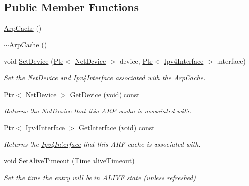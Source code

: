 \subsection*{Public Member Functions}
\begin{DoxyCompactItemize}
\item 
\hyperlink{classns3_1_1ArpCache_ab8f759ac5cf08b48f1c7f1024c4b482f}{Arp\+Cache} ()
\item 
\hyperlink{classns3_1_1ArpCache_a2b97679e365f8b80cdf620f23d2a5695}{$\sim$\+Arp\+Cache} ()
\item 
void \hyperlink{classns3_1_1ArpCache_a8cd550f89be088d8941f65f5ab3f8241}{Set\+Device} (\hyperlink{classns3_1_1Ptr}{Ptr}$<$ \hyperlink{classns3_1_1NetDevice}{Net\+Device} $>$ device, \hyperlink{classns3_1_1Ptr}{Ptr}$<$ \hyperlink{classns3_1_1Ipv4Interface}{Ipv4\+Interface} $>$ interface)
\begin{DoxyCompactList}\small\item\em Set the \hyperlink{classns3_1_1NetDevice}{Net\+Device} and \hyperlink{classns3_1_1Ipv4Interface}{Ipv4\+Interface} associated with the \hyperlink{classns3_1_1ArpCache}{Arp\+Cache}. \end{DoxyCompactList}\item 
\hyperlink{classns3_1_1Ptr}{Ptr}$<$ \hyperlink{classns3_1_1NetDevice}{Net\+Device} $>$ \hyperlink{classns3_1_1ArpCache_ad5772bef995ba37ef8b2607fe9a878e1}{Get\+Device} (void) const 
\begin{DoxyCompactList}\small\item\em Returns the \hyperlink{classns3_1_1NetDevice}{Net\+Device} that this A\+RP cache is associated with. \end{DoxyCompactList}\item 
\hyperlink{classns3_1_1Ptr}{Ptr}$<$ \hyperlink{classns3_1_1Ipv4Interface}{Ipv4\+Interface} $>$ \hyperlink{classns3_1_1ArpCache_a0876842c4ecdfcc3d8a591545163a3b8}{Get\+Interface} (void) const 
\begin{DoxyCompactList}\small\item\em Returns the \hyperlink{classns3_1_1Ipv4Interface}{Ipv4\+Interface} that this A\+RP cache is associated with. \end{DoxyCompactList}\item 
void \hyperlink{classns3_1_1ArpCache_a69b80e4ba6fa363178e72eb090a903d4}{Set\+Alive\+Timeout} (\hyperlink{classns3_1_1Time}{Time} alive\+Timeout)
\begin{DoxyCompactList}\small\item\em Set the time the entry will be in A\+L\+I\+VE state (unless refreshed) \end{DoxyCompactList}\item 

\end{DoxyCompactItemize}
